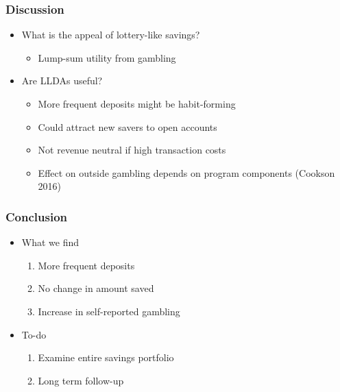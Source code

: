 \documentclass{beamer}
\begin{document}
\begin{frame} \frametitle{Discussion} \pause

	\begin{itemize}
	\item What is the appeal of lottery-like savings? \pause
		\begin{itemize}
		\item Lump-sum utility from gambling \pause
		\end{itemize}
	\item Are LLDAs useful? \pause
		\begin{itemize}
		\item More frequent deposits might be habit-forming \pause
		\item Could attract new savers to open accounts \pause
		\item Not revenue neutral if high transaction costs \pause
		\item Effect on outside gambling depends on program components (Cookson 2016) \pause
		\end{itemize}
	\end{itemize}

\end{frame}


\begin{frame} \frametitle{Conclusion} \pause
	
	\begin{itemize}
	\item What we find
		\begin{enumerate}
		\item More frequent deposits \pause
		\item No change in amount saved \pause
		\item Increase in self-reported gambling \pause
		\end{enumerate}
	\item To-do
		\begin{enumerate}
		\item Examine entire savings portfolio \pause
		\item Long term follow-up \pause
		\end{enumerate}
	\end{itemize}

\end{frame}
\end{document}
